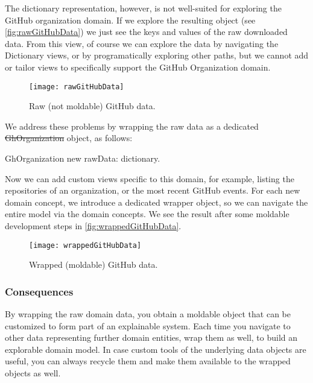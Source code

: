 \documentclass[sigconf]{acmart}
\newcommand\tg[1]{\nbc{TG}{#1}{blue}}
\begin{document}
The dictionary representation, however, is not well-suited for exploring the GitHub organization domain.
If we explore the resulting object (see \autoref{fig:rawGitHubData}) we just see the keys and values of the raw downloaded data.
From this view, of course we can explore the data by navigating the Dictionary views, or by programatically exploring other paths, but we cannot add or tailor views to specifically support the GitHub Organization domain.

\begin{figure}[h]
  \texttt{[image: rawGitHubData]}
  \caption{Raw (not moldable) GitHub data.}
  \label{fig:rawGitHubData}
\end{figure}

We address these problems by wrapping the raw data as a dedicated \st{GhOrganization} object, as follows:

\begin{code}
GhOrganization new rawData: dictionary.
\end{code}

Now we can add custom views specific to this domain, for example, listing the repositories of an organization, or the most recent GitHub events.
For each new domain concept, we introduce a dedicated wrapper object, so we can navigate the entire model via the domain concepts.
We see the result after some moldable development steps in \autoref{fig:wrappedGitHubData}.

\begin{figure}[h]
  \texttt{[image: wrappedGitHubData]}
  \caption{Wrapped (moldable) GitHub data.}
  \label{fig:wrappedGitHubData}
\end{figure}

\subsubsection*{Consequences}

By wrapping the raw domain data, you obtain a moldable object that can be customized to form part of an explainable system.
Each time you navigate to other data representing further domain entities, wrap them as well, to build an explorable domain model.
In case custom tools of the underlying data objects are useful, you can always recycle them and make them available to the wrapped objects as well.

\end{document}
